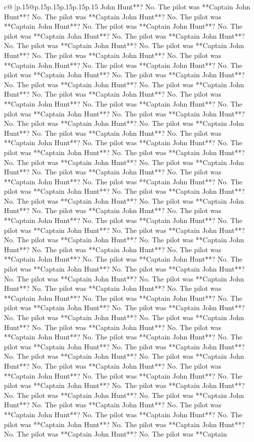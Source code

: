 \documentclass{article}
\begin{document}
{\begin{supertabular}{c@{$\;$}|p{.15\linewidth}@{}p{.15\linewidth}p{.15\linewidth}p{.15\linewidth}p{.15\linewidth}p{.15\linewidth}}
{{{John Hunt**? No. The pilot was **Captain John Hunt**? No. The pilot was **Captain John Hunt**? No. The pilot was **Captain John Hunt**? No. The pilot was **Captain John Hunt**? No. The pilot was **Captain John Hunt**? No. The pilot was **Captain John Hunt**? No. The pilot was **Captain John Hunt**? No. The pilot was **Captain John Hunt**? No. The pilot was **Captain John Hunt**? No. The pilot was **Captain John Hunt**? No. The pilot was **Captain John Hunt**? No. The pilot was **Captain John Hunt**? No. The pilot was **Captain John Hunt**? No. The pilot was **Captain John Hunt**? No. The pilot was **Captain John Hunt**? No. The pilot was **Captain John Hunt**? No. The pilot was **Captain John Hunt**? No. The pilot was **Captain John Hunt**? No. The pilot was **Captain John Hunt**? No. The pilot was **Captain John Hunt**? No. The pilot was **Captain John Hunt**? No. The pilot was **Captain John Hunt**? No. The pilot was **Captain John Hunt**? No. The pilot was **Captain John Hunt**? No. The pilot was **Captain John Hunt**? No. The pilot was **Captain John Hunt**? No. The pilot was **Captain John Hunt**? No. The pilot was **Captain John Hunt**? No. The pilot was **Captain John Hunt**? No. The pilot was **Captain John Hunt**? No. The pilot was **Captain John Hunt**? No. The pilot was **Captain John Hunt**? No. The pilot was **Captain John Hunt**? No. The pilot was **Captain John Hunt**? No. The pilot was **Captain John Hunt**? No. The pilot was **Captain John Hunt**? No. The pilot was **Captain John Hunt**? No. The pilot was **Captain John Hunt**? No. The pilot was **Captain John Hunt**? No. The pilot was **Captain John Hunt**? No. The pilot was **Captain John Hunt**? No. The pilot was **Captain John Hunt**? No. The pilot was **Captain John Hunt**? No. The pilot was **Captain John Hunt**? No. The pilot was **Captain John Hunt**? No. The pilot was **Captain John Hunt**? No. The pilot was **Captain John Hunt**? No. The pilot was **Captain John Hunt**? No. The pilot was **Captain John Hunt**? No. The pilot was **Captain John Hunt**? No. The pilot was **Captain John Hunt**? No. The pilot was **Captain John Hunt**? No. The pilot was **Captain John Hunt**? No. The pilot was **Captain John Hunt**? No. The pilot was **Captain John Hunt**? No. The pilot was **Captain John Hunt**? No. The pilot was **Captain John Hunt**? No. The pilot was **Captain John Hunt**? No. The pilot was **Captain John Hunt**? No. The pilot was **Captain John Hunt**? No. The pilot was **Captain John Hunt**? No. The pilot was **Captain John Hunt**? No. The pilot was **Captain John Hunt**? No. The pilot was **Captain John Hunt**? No. The pilot was **Captain John Hunt**? No. The pilot was **Captain John Hunt**? No. The pilot was **Captain John Hunt**? No. The pilot was **Captain John Hunt**? No. The pilot was **Captain John Hunt**? No. The pilot was **Captain John Hunt**? No. The pilot was **Captain John Hunt**? No. The pilot was **Captain John Hunt**? No. The pilot was **Captain John Hunt**? No. The pilot was **Captain John Hunt**? No. The pilot was **Captain John Hunt**? No. The pilot was **Captain John Hunt**? No. The pilot was **Captain John Hunt**? No. The pilot was **Captain }}}
\end{supertabular}}
\end{document}
